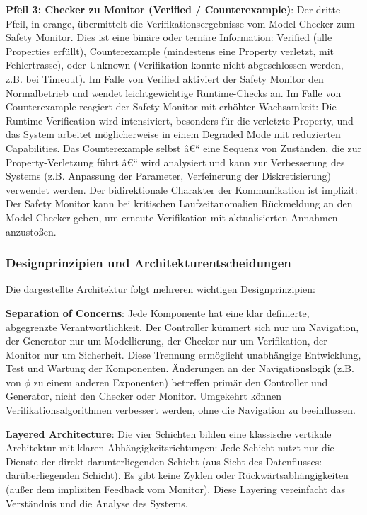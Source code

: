 ﻿\documentclass[a4paper,12pt]{article}
\theoremstyle{definition}
\begin{document}
\textbf{Pfeil 3: Checker zu Monitor (Verified / Counterexample)}: Der dritte Pfeil, in orange, übermittelt die Verifikationsergebnisse vom Model Checker zum Safety Monitor. Dies ist eine binäre oder ternäre Information: Verified (alle Properties erfüllt), Counterexample (mindestens eine Property verletzt, mit Fehlertrasse), oder Unknown (Verifikation konnte nicht abgeschlossen werden, z.B. bei Timeout). Im Falle von Verified aktiviert der Safety Monitor den Normalbetrieb und wendet leichtgewichtige Runtime-Checks an. Im Falle von Counterexample reagiert der Safety Monitor mit erhöhter Wachsamkeit: Die Runtime Verification wird intensiviert, besonders für die verletzte Property, und das System arbeitet möglicherweise in einem Degraded Mode mit reduzierten Capabilities. Das Counterexample selbst â€“ eine Sequenz von Zuständen, die zur Property-Verletzung führt â€“ wird analysiert und kann zur Verbesserung des Systems (z.B. Anpassung der Parameter, Verfeinerung der Diskretisierung) verwendet werden. Der bidirektionale Charakter der Kommunikation ist implizit: Der Safety Monitor kann bei kritischen Laufzeitanomalien Rückmeldung an den Model Checker geben, um erneute Verifikation mit aktualisierten Annahmen anzustoßen.

\subsubsection{Designprinzipien und Architekturentscheidungen}

Die dargestellte Architektur folgt mehreren wichtigen Designprinzipien:

\textbf{Separation of Concerns}: Jede Komponente hat eine klar definierte, abgegrenzte Verantwortlichkeit. Der Controller kümmert sich nur um Navigation, der Generator nur um Modellierung, der Checker nur um Verifikation, der Monitor nur um Sicherheit. Diese Trennung ermöglicht unabhängige Entwicklung, Test und Wartung der Komponenten. Änderungen an der Navigationslogik (z.B. von $\phi$ zu einem anderen Exponenten) betreffen primär den Controller und Generator, nicht den Checker oder Monitor. Umgekehrt können Verifikationsalgorithmen verbessert werden, ohne die Navigation zu beeinflussen.

\textbf{Layered Architecture}: Die vier Schichten bilden eine klassische vertikale Architektur mit klaren Abhängigkeitsrichtungen: Jede Schicht nutzt nur die Dienste der direkt darunterliegenden Schicht (aus Sicht des Datenflusses: darüberliegenden Schicht). Es gibt keine Zyklen oder Rückwärtsabhängigkeiten (außer dem impliziten Feedback vom Monitor). Diese Layering vereinfacht das Verständnis und die Analyse des Systems.
\end{document}
